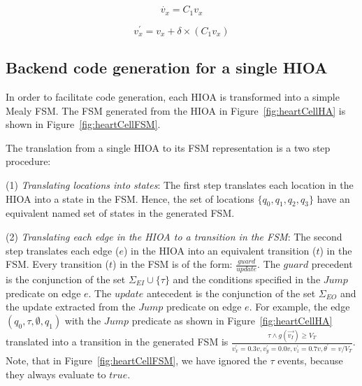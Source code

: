 \begin{equation}
  \dot{v_x} = C_{1} v_x
  \label{eq:ode}
\end{equation}

\begin{equation}
  v^\prime_x = v_x + \delta \times (C_{1} v_x)
  \label{eq:euler_equiv}
\end{equation}

\setlength{\belowdisplayskip}{\baselineskip} 
\setlength{\belowdisplayshortskip}{\baselineskip}
\setlength{\abovedisplayskip}{\baselineskip} 
\setlength{\abovedisplayshortskip}{\baselineskip}


\subsection{Backend code generation for a single \ac{HIOA}}
\label{sec:backendCodeGeneration}


In order to facilitate code generation, each \ac{HIOA} is transformed
into a simple Mealy \ac{FSM}. The \ac{FSM} generated from the \ac{HIOA}
in Figure~\ref{fig:heartCellHA} is shown in
Figure~\ref{fig:heartCellFSM}.

The translation from a single \ac{HIOA} to its \ac{FSM} representation
is a two step procedure:

(1) \textit{Translating locations into states}: The first step
  translates each location in the \ac{HIOA} into a state in the
  \ac{FSM}. Hence, the set of locations $\{q_{0}, q_{1}, q_{2}, q_{3}\}$
  have an equivalent named set of states in the generated \ac{FSM}.

(2) \textit{Translating each edge in the \ac{HIOA} to a transition in
    the \ac{FSM}}: The second step translates each edge ($e$) in the
  \ac{HIOA} into an equivalent transition ($t$) in the \ac{FSM}. Every
  transition ($t$) in the \ac{FSM} is of the form:
  $\frac{guard}{update}$. The $guard$ precedent is the conjunction of
  the set $\Sigma_{EI} \cup \{\tau\}$ and the conditions specified in
  the $Jump$ predicate on edge $e$. The $update$ antecedent is the
  conjunction of the set $\Sigma_{EO}$ and the update extracted from the $Jump$ 
  predicate on edge $e$. For example, the
  edge $(q_{0}, \tau, \emptyset, q_{1})$ with the $Jump$ predicate as
  shown in Figure~\ref{fig:heartCellHA} translated into a transition in
  the generated \ac{FSM} is
  $\frac{\tau \wedge g(\vec{v_{I}}) \geq V_{T}}{v^{\prime}_{x} = 0.3v,
    v^{\prime}_{y}=0.0v, v^{\prime}_{z}=0.7v, \theta^{\prime}=v/V_{T}}$. Note, 
  that in
  Figure~\ref{fig:heartCellFSM}, we have ignored the $\tau$ events,
  because they always evaluate to $true$.


